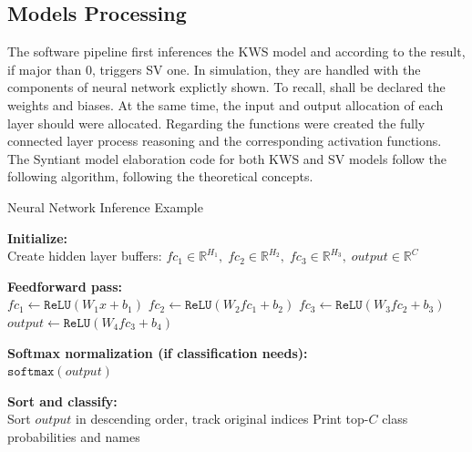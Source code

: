 \subsection{Models Processing}
The software pipeline first inferences the KWS model and according to the result, if major than 0, triggers SV one. In simulation, they are handled with the components of neural network explictly shown. To recall, shall be declared the weights and biases. At the same time, the input and output allocation of each layer should were allocated. Regarding the functions were created the fully connected layer process reasoning and the corresponding activation functions. The Syntiant model elaboration code for both KWS and SV models follow the following algorithm\footnotemark{}, following the theoretical concepts.\newline
\begin{algorithm}[H]
\caption{Neural Network Inference Example}

\textbf{Initialize:} \\
\Indp
Create hidden layer buffers:
$fc_1 \in \mathbb{R}^{H_1}, \;
fc_2 \in \mathbb{R}^{H_2}, \;
fc_3 \in \mathbb{R}^{H_3}, \;
output \in \mathbb{R}^{C}$ \;
\Indm

\textbf{Feedforward pass:} \\
\Indp
$fc_1 \gets \texttt{ReLU}(W_1 x + b_1)$ \;
$fc_2 \gets \texttt{ReLU}(W_2 fc_1 + b_2)$ \;
$fc_3 \gets \texttt{ReLU}(W_3 fc_2 + b_3)$ \;
$output \gets \texttt{ReLU}(W_4 fc_3 + b_4)$ \;
\Indm

\textbf{Softmax normalization (if classification needs):} \\
\Indp
$\texttt{softmax}(output)$ \;
\Indm

\textbf{Sort and classify:} \\
\Indp
Sort $output$ in descending order, track original indices \;
Print top-$C$ class probabilities and names \;
\Indm

\end{algorithm}

